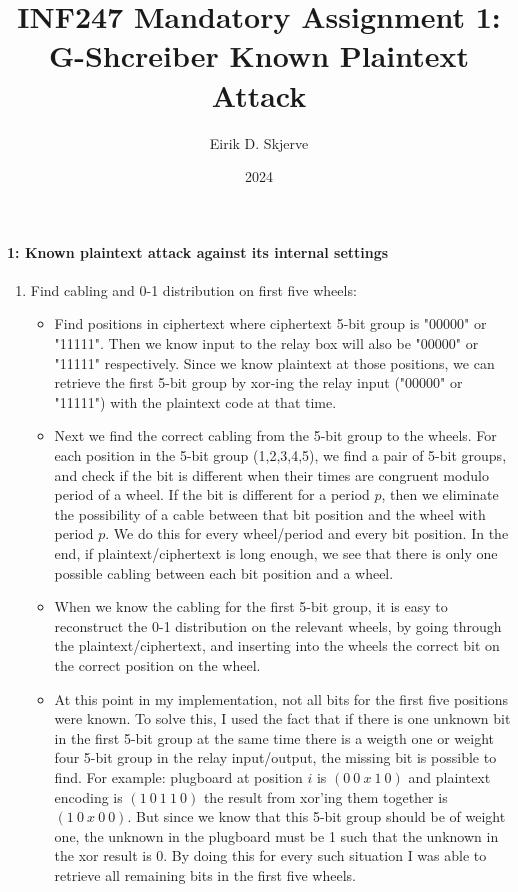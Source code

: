 \documentclass{article}
\title{INF247 Mandatory Assignment 1: G-Shcreiber Known Plaintext Attack}
\author{Eirik D. Skjerve}
\date{2024}
\begin{document}
\maketitle
\paragraph{1: Known plaintext attack against its internal settings}
\begin{enumerate}
    \item Find cabling and 0-1 distribution on first five wheels:
    \begin{itemize}
        \item Find positions in ciphertext where ciphertext 5-bit group
        is "00000" or "11111". Then we know input to the relay box will also be "00000" or "11111" respectively.
        Since we know plaintext at those positions, we can retrieve the first 5-bit group by xor-ing 
        the relay input ("00000" or "11111") with the plaintext code at that time.
        \item Next we find the correct cabling from the 5-bit group to the wheels.
        For each position in the 5-bit group (1,2,3,4,5), we find a pair of 5-bit groups, and check
        if the bit is different when their times are congruent modulo period of a wheel.
        If the bit is different for a period $p$, then we eliminate the possibility of a cable
        between that bit position and the wheel with period $p$. We do this for every wheel/period and every bit position.
        In the end, if plaintext/ciphertext is long enough, we see that there is only one possible cabling between each
        bit position and a wheel. 
        \item When we know the cabling for the first 5-bit group, it is easy to reconstruct the 0-1 distribution on the relevant wheels,
        by going through the plaintext/ciphertext, and inserting into the wheels the correct bit on the correct position on the wheel.
        \item At this point in my implementation, not all bits for the first five positions were known.
        To solve this, I used the fact that if there is one unknown bit in the first 5-bit group at the same time
        there is a weigth one or weight four 5-bit group in the relay input/output, the missing bit is possible to find.
        For example: plugboard at position $i$ is $(0\ 0\ x\ 1\ 0)$ and plaintext encoding is $(1\ 0\ 1\ 1\ 0)$
        the result from xor'ing them together is $(1\ 0\ x\ 0\ 0)$. But since we know that this 5-bit group should be of weight
        one, the unknown in the plugboard must be 1 such that the unknown in the xor result is 0. By doing this for every such situation I was able to retrieve all
        remaining bits in the first five wheels.


\end{itemize}
\end{enumerate}
\end{document}
